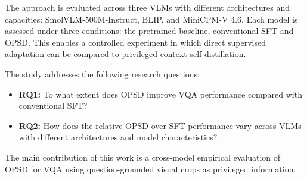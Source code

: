 The approach is evaluated across three VLMs with different architectures and capacities: SmolVLM-500M-Instruct,
BLIP, and MiniCPM-V 4.6. Each model is assessed under three conditions: the pretrained baseline,
conventional SFT and OPSD. This enables a controlled experiment in which direct supervised adaptation can
be compared to privileged-context self-distillation.

The study addresses the following research questions:

\begin{itemize}
\item \textbf{RQ1:} To what extent does OPSD improve VQA performance compared with conventional SFT?
\item \textbf{RQ2:} How does the relative OPSD-over-SFT performance vary across VLMs with different architectures and model characteristics?
\end{itemize}

The main contribution of this work is a cross-model empirical evaluation of OPSD for VQA using
question-grounded visual crops as privileged information.